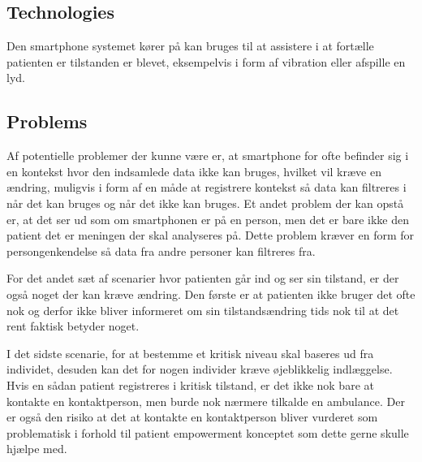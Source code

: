 \subsection{Technologies}
Den smartphone systemet kører på kan bruges til at assistere i at fortælle patienten er tilstanden er blevet, eksempelvis i form af vibration eller afspille en lyd.

\subsection{Problems}
Af potentielle problemer der kunne være er, at smartphone for ofte befinder sig i en kontekst hvor den indsamlede data ikke kan bruges, hvilket vil kræve en ændring, muligvis i form af en måde at registrere kontekst så data kan filtreres i når det kan bruges og når det ikke kan bruges.
Et andet problem der kan opstå er, at det ser ud som om smartphonen er på en person, men det er bare ikke den patient det er meningen der skal analyseres på.
Dette problem kræver en form for persongenkendelse så data fra andre personer kan filtreres fra.

For det andet sæt af scenarier hvor patienten går ind og ser sin tilstand, er der også noget der kan kræve ændring.
Den første er at patienten ikke bruger det ofte nok og derfor ikke bliver informeret om sin tilstandsændring tids nok til at det rent faktisk betyder noget.

I det sidste scenarie, for at bestemme et kritisk niveau skal baseres ud fra individet, desuden kan det for nogen individer kræve øjeblikkelig indlæggelse.
Hvis en sådan patient registreres i kritisk tilstand, er det ikke nok bare at kontakte en kontaktperson, men burde nok nærmere tilkalde en ambulance.
Der er også den risiko at det at kontakte en kontaktperson bliver vurderet som problematisk i forhold til patient empowerment konceptet som dette gerne skulle hjælpe med. 

